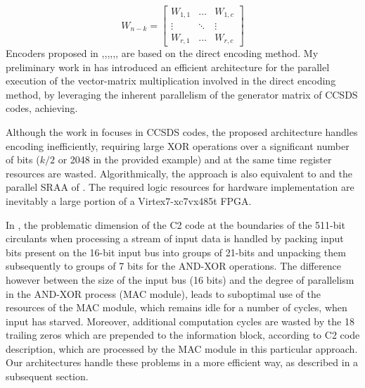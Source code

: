 \begin{equation}
    W_{n-k}=
    \begin{bmatrix}
        W_{1,1} & \dots  & W_{1,c} \\
        \vdots  & \ddots & \vdots \\
        W_{r,1} & \dots  & W_{r,c}
    \end{bmatrix}
    \label{eq:Wstructure}                   
\end{equation}
Encoders proposed in \cite{Theodoropoulos2016},\cite{ZhaohuiWangXinHaoChangxingLin2018},\cite{Miles2006},\cite{ZongwangLi2006},\cite{Andrews2005},\cite{Yasotharan2009},\cite{Yen2012}  are based on the direct encoding method. My preliminary  work in \cite{Theodoropoulos2016} has introduced an efficient architecture for the parallel execution of the vector-matrix multiplication involved in the direct encoding method, by leveraging the inherent parallelism of the generator matrix of CCSDS codes, achieving.\par
Although the work in \cite{ZhaohuiWangXinHaoChangxingLin2018} focuses in CCSDS codes, the proposed architecture handles encoding inefficiently, requiring large XOR operations over a significant number of bits ($k/2$ or 2048 in the provided example) and at the same time register resources are wasted. Algorithmically, the approach is also equivalent to \cite{Yasotharan2009} and the parallel SRAA of \cite{ZongwangLi2006}. The required logic resources for hardware implementation are inevitably a large portion of a Virtex7-xc7vx485t FPGA.\par
In \cite{Miles2006}, the problematic dimension of the C2 code at the boundaries of the 511-bit circulants when processing a stream of input data is handled by packing input bits present on the 16-bit input bus into groups of 21-bits and unpacking them subsequently to groups of 7 bits for the AND-XOR operations. The difference however between the size of the input bus (16 bits) and the degree of parallelism in the AND-XOR process (MAC module), leads to suboptimal use of the resources of the MAC module, which remains idle for a number of cycles, when input has starved. Moreover, additional computation cycles are wasted by the 18 trailing zeros which are prepended to the information block, according to C2 code description, which are processed by the MAC module in this particular approach. Our architectures handle these problems in a more efficient way, as described in a subsequent section.\par
